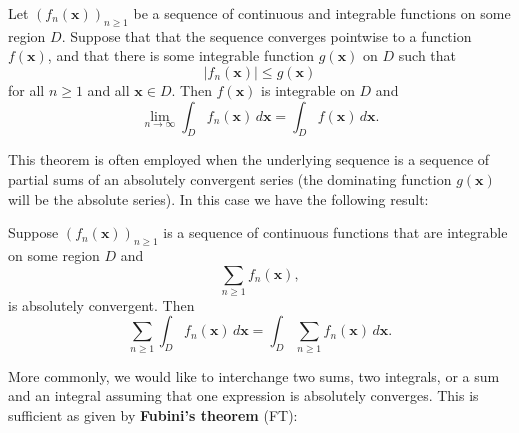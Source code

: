     \begin{theorem}
      Let $(f_{n}(\mathbf{x}))_{n \ge 1}$ be a sequence of continuous and integrable functions on some region $D$. Suppose that that the sequence converges pointwise to a function $f(\mathbf{x})$, and that there is some integrable function $g(\mathbf{x})$ on $D$ such that
      \[
        |f_{n}(\mathbf{x})| \le g(\mathbf{x})
      \]
      for all $n \ge 1$ and all $\mathbf{x} \in D$. Then $f(\mathbf{x})$ is integrable on $D$ and
      \[
        \lim_{n \to \infty}\int_{D}f_{n}(\mathbf{x})\,d\mathbf{x} = \int_{D}f(\mathbf{x})\,d\mathbf{x}.
      \]
    \end{theorem}

    This theorem is often employed when the underlying sequence is a sequence of partial sums of an absolutely convergent series (the dominating function $g(\mathbf{x})$ will be the absolute series). In this case we have the following result:

    \begin{corollary}\label{cor:DCT_for_series_and_integrals}
      Suppose $(f_{n}(\mathbf{x}))_{n \ge 1}$ is a sequence of continuous functions that are integrable on some region $D$ and
      \[
        \sum_{n \ge 1}f_{n}(\mathbf{x}),
      \]
      is absolutely convergent. Then
      \[
        \sum_{n \ge 1}\int_{D}f_{n}(\mathbf{x})\,d\mathbf{x} = \int_{D}\sum_{n \ge 1}f_{n}(\mathbf{x})\,d\mathbf{x}.
      \]
    \end{corollary}

    More commonly, we would like to interchange two sums, two integrals, or a sum and an integral assuming that one expression is absolutely converges. This is sufficient as given by \textbf{Fubini's theorem} (FT):

